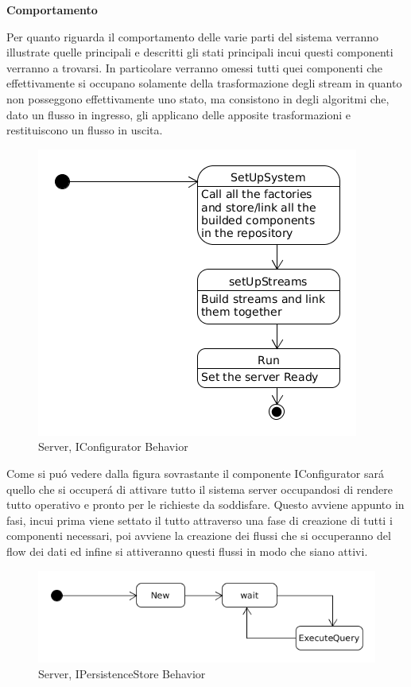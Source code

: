 \afterpage{\clearpage}

\newpage

\begin{center}
\textbf{Comportamento}
\end{center}

Per quanto riguarda il comportamento delle varie parti del sistema verranno illustrate quelle principali e descritti gli stati principali incui questi componenti verranno a trovarsi. In particolare verranno omessi tutti quei componenti che effettivamente si occupano solamente della trasformazione degli stream in quanto non posseggono effettivamente uno stato, ma consistono in degli algoritmi che, dato un flusso in ingresso, gli applicano delle apposite trasformazioni e restituiscono un flusso in uscita.

\begin{figure}[h]
\centering
\includegraphics[scale=0.5]{Figures/LogicArchitecture/Server/IConfiguratorBehavior}
\caption{Server, IConfigurator Behavior}
\end{figure}

Come si pu\'o vedere dalla figura sovrastante il componente IConfigurator sar\'a quello che si occuper\'a di attivare tutto il sistema server occupandosi di rendere tutto operativo e pronto per le richieste da soddisfare. Questo avviene appunto in fasi, incui prima viene settato il tutto attraverso una fase di creazione di tutti i componenti necessari, poi avviene la creazione dei flussi che si occuperanno del flow dei dati ed infine si attiveranno questi flussi in modo che siano attivi.

\begin{figure}[h]
\centering
\includegraphics[width=\textwidth]{Figures/LogicArchitecture/Server/IPersistenceStoreBehavior}
\caption{Server, IPersistenceStore Behavior}
\end{figure}


